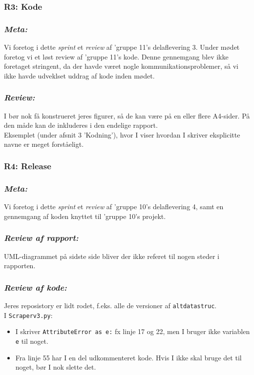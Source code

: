 \documentclass[12pt]{article}
\begin{document}
\subsubsection{R3: Kode}
\subsubsection*{\textit{Meta:}}
Vi foretog i dette \textit{sprint} et \textit{review} af 'gruppe 11's delaflevering 3. Under mødet foretog vi et løst review af 'gruppe 11's kode. Denne gennemgang blev ikke foretaget stringent, da der havde været nogle kommunikationsproblemer, så vi ikke havde udveklset uddrag af kode inden mødet.

\subsubsection*{\textit{Review:}}
I bør nok få konstrueret jeres figurer, så de kan være på en eller flere A4-sider. På den måde kan de inkluderes i den endelige rapport. \\
Eksemplet (under afsnit 3 'Kodning'), hvor I viser hvordan I skriver eksplicitte navne er meget forståeligt. \\

\subsubsection{R4: Release}
\subsubsection*{\textit{Meta:}}
Vi foretog i dette \textit{sprint} et \textit{review} af 'gruppe 10's delaflevering 4, samt en gennemgang af koden knyttet til 'gruppe 10's projekt.

\subsubsection*{\textit{Review af rapport:}}
UML-diagrammet på sidste side bliver der ikke referet til nogen steder i rapporten.

\subsubsection*{\textit{Review af kode:}}
Jeres reposistory er lidt rodet, f.eks. alle de versioner af \texttt{altdatastruc}. \\
I \texttt{Scraperv3.py}:
\begin{itemize}
\item I skriver \texttt{AttributeError as e:} fx linje 17 og 22, men I bruger ikke variablen \texttt{e} til noget.
\item Fra linje 55 har I en del udkommenteret kode. Hvis I ikke skal bruge det til noget, bør I nok slette det.
\end{itemize}
\end{document}
